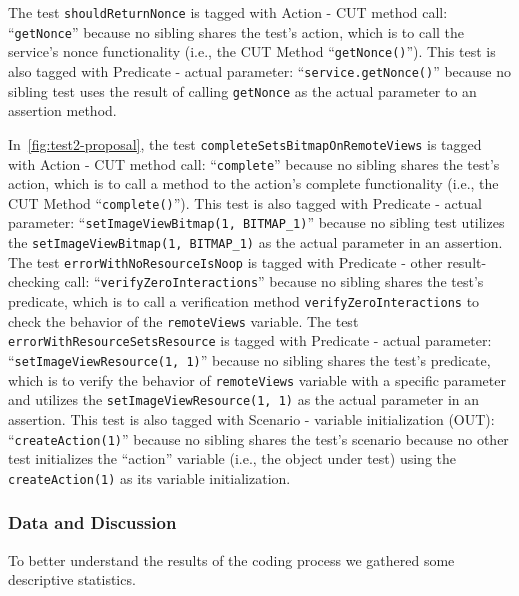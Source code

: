 \documentclass[proposal.tex]{subfiles}
\begin{document}
The test \texttt{shouldReturnNonce} is tagged with Action - CUT method call: \enquote{\texttt{getNonce}} because no sibling shares the test’s action, which is to call the service’s nonce functionality (i.e., the CUT Method \enquote{\texttt{getNonce()}}).
%
This test is also tagged with Predicate - actual parameter: \enquote{\texttt{service.getNonce()}} because no sibling test uses the result of calling \texttt{getNonce} as the actual parameter to an assertion method.


In~\cref{fig:test2-proposal}, the test \texttt{completeSetsBitmapOnRemoteViews} is tagged with Action - CUT method call: \enquote{\texttt{complete}} because no sibling shares the test’s action, which is to call a method to the action’s complete functionality (i.e., the CUT Method \enquote{\texttt{complete()}}).
%
This test is also tagged with Predicate - actual parameter: \enquote{\texttt{setImageViewBitmap(1, BITMAP\_1)}} because no sibling test utilizes the \texttt{setImageViewBitmap(1, BITMAP\_1)} as the actual parameter in an assertion.
%
The test \texttt{errorWithNoResourceIsNoop} is tagged with Predicate - other result-checking call: \enquote{\texttt{verifyZeroInteractions}} because no sibling shares the test’s predicate, which is to call a verification method \texttt{verifyZeroInteractions} to check the behavior of the \texttt{remoteViews} variable.
%
The test \texttt{errorWithResourceSetsResource} is tagged with Predicate - actual parameter: \enquote{\texttt{setImageViewResource(1, 1)}} because no sibling shares the test’s predicate, which is to verify the behavior of \texttt{remoteViews} variable with a specific parameter and utilizes the \texttt{setImageViewResource(1, 1)} as the actual parameter in an assertion.
%
This test is also tagged with Scenario - variable initialization (OUT): \enquote{\texttt{createAction(1)}} because no sibling shares the test’s scenario because no other test initializes the \enquote{action} variable (i.e., the object under test) using the \texttt{createAction(1)} as its variable initialization.

\subsubsection{Data and Discussion}

To better understand the results of the coding process we gathered some descriptive statistics.
\end{document}
